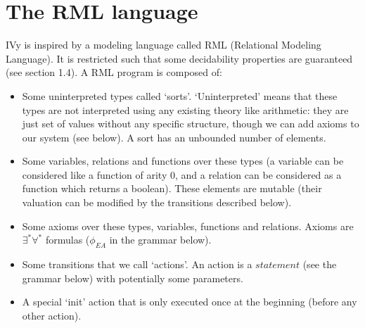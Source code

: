 \documentclass[11pt,a4paper,oldfontcommands,openany]{memoir}
\begin{document}
    \section{The RML language}

    IVy is inspired by a modeling language called RML (Relational Modeling Language). It is restricted such that some decidability properties are guaranteed (see section 1.4).
    A RML program is composed of:
    \begin{itemize}
        \item Some uninterpreted types called `sorts'. `Uninterpreted' means that these types are not interpreted using any existing theory like arithmetic:
        they are just set of values without any specific structure, though we can add axioms to our system (see below).
        A sort has an unbounded number of elements.
        \item Some variables, relations and functions over these types (a variable can be considered like a function of arity 0, and a relation can be considered as a function
        which returns a boolean). These elements are mutable (their valuation can be modified by the transitions described below).
        \item Some axioms over these types, variables, functions and relations. Axioms are \(\exists^*\forall^*\) formulas (\( \phi_{EA} \) in the grammar below).
        \item Some transitions that we call `actions'. An action is a \(statement\) (see the grammar below) with potentially some parameters.
        \item A special `init' action that is only executed once at the beginning (before any other action).
    \end{itemize}
\end{document}
